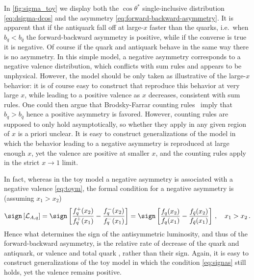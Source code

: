 In \cref{fig:sigma_toy} we display both the $\cos\theta^*$
single-inclusive distribution \cref{eq:dsigma-dcos} and
the asymmetry \cref{eq:forward-backward-asymmetry}.
%
It is apparent that if the  antiquark \pdfs fall off at large-$x$ faster than
the quarks, i.e.\ when $b_q < b_{\bar{q}}$ the forward-backward
asymmetry is positive, while if the converse is true it is
negative. Of course if the quark and antiquark \pdfs behave in the same
way there is no asymmetry.
%
In this simple model, a negative asymmetry corresponds to a negative
valence distribution, which conflicts with sum rules and appears to be
unphysical. However, the model should be only taken as illustrative of
the large-$x$ behavior: it is of course easy to construct \pdfs that
reproduce this behavior at very large $x$, while leading to a positive
valence \pdf as $x$ decreases, consistent with sum rules. One could then argue that
Brodsky-Farrar counting rules~\cite{Brodsky:1973kr,Brodsky:1974vy}
imply that  $b_q > b_{\bar{q}}$
hence a positive asymmetry is favored.
%
However,
counting rules are supposed to only hold asymptotically, so whether
they apply in any given region of $x$ is a priori unclear.
%
It is easy
to construct generalizations of the model in which the behavior
leading to a negative asymmetry is reproduced at large enough $x$, yet
the valence \pdfs are positive at smaller $x$, and the counting rules
apply in the strict $x\to1$ limit.

In fact, whereas in the toy model a negative asymmetry is
associated with a negative valence
\cref{eq:toym}, the formal condition for a negative asymmetry is
(assuming $x_1>x_2$)
\begin{equation}\label{eq:signas}
   \sign\left[\mathcal{L}_{A,q}\right]=\sign\left[\frac{ f_q^+(x_2)}{
       f_q^+(x_1)}-\frac{
       f_q^-(x_2)}{f_q^-(x_1)}\right]=\sign\left[\frac{ f_q(x_2)}{
       f_q(x_1)}-\frac{f_{\bar{q}}(x_2)}{f_{\bar{q}}(x_1)}\right] \, , \quad x_1>x_2 \,.
\end{equation}
Hence what determines the sign of the antisymmetric luminosity, and thus
of the forward-backward asymmetry, is the relative rate of decrease of
the quark and antiquark, or valence and total quark \pdfs, rather than
their sign. Again, it is easy to construct generalizations of the
toy model in which the condition \cref{eq:signas} still holds,  yet
the valence \pdf remains positive.

